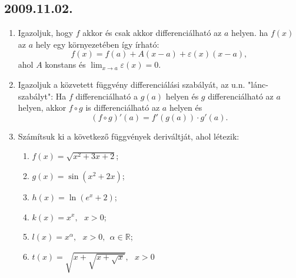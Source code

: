 \documentclass{article}
\newenvironment{abc}{\begin{enumerate}[label=\textit{\alph*})]}{\end{enumerate}}
\begin{document}
\subsection*{2009.11.02.}
\begin{enumerate}
\item Igazoljuk, hogy $f$ akkor és csak akkor differenciálható az \underline{$a$} helyen. 		ha $f(x)$ az \underline{$a$} hely egy környezetében így írható:
	\[f(x)=f(a)+A(x-a)+\varepsilon (x)(x-a), \]
	ahol $A$ konstans és $\lim_{x \to a} \varepsilon (x)=0$.
\item Igazoljuk a közvetett függvény differenciálási szabályát, az u.n. "lánc-szabályt": 		Ha $f$ differenciálható a $g(a)$ helyen és $g$ differenciálható az $a$ helyen, akkor 		$f\circ g$ is differenciálható az $a$ helyen és \[(f \circ g)'(a)=f'(g(a))\cdot g'(a).		\] 
\item Számítsuk ki a következő függvények deriváltját, ahol létezik:
	\begin{abc}
	\item $f(x)=\sqrt{x^2+3x+2}$;
	\item $g(x)=\sin(x^2+2x)$;
	\item $h(x)=\ln(e^x+2)$;
	\item $k(x)=x^x,~~~x>0$;
	\item $l(x)=x^\alpha,~~~x>0,~~\alpha \in \mathbb{R}$;
	\item $t(x)=\sqrt{x+\sqrt{x+\sqrt{x}}},~~~x>0$
	\end{abc}
\end{enumerate}
\end{document}
